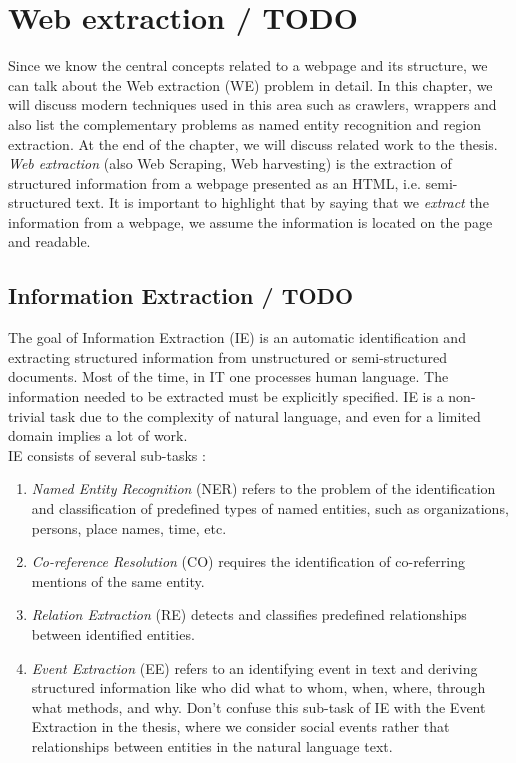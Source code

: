\chapter{Web extraction / TODO}

Since we know the central concepts related to a webpage and its structure, we can talk about the Web extraction (WE) problem in detail. In this chapter, we will discuss modern techniques used in this area such as crawlers, wrappers and also list the complementary problems as named entity recognition and region extraction. At the end of the chapter, we will discuss related work to the thesis.\\

\textit{Web extraction} (also Web Scraping, Web harvesting) is the extraction of structured information from a webpage presented as an HTML, i.e. semi-structured text. It is important to highlight that by saying that we \textit{extract} the information from a webpage, we assume the information is located on the page and readable.


\section{Information Extraction / TODO}

The goal of Information Extraction (IE) is an automatic identification and extracting structured information from unstructured or semi-structured documents. Most of the time, in IT one processes human language. The information needed to be extracted must be explicitly specified. IE is a non-trivial task due to the complexity of natural language, and even for a limited domain implies a lot of work.\\

IE consists of several sub-tasks \cite{InfExtr}:

\begin{enumerate}
    \item \textit{Named Entity Recognition} (NER) refers to the problem of the identification and classification of predefined types of named entities, such as organizations, persons, place names, time, etc.
    \item \textit{Co-reference Resolution} (CO) requires the identification of co-referring mentions of the same entity.
    \item \textit{Relation Extraction} (RE) detects and classifies predefined relationships between identified entities.
    \item \textit{Event Extraction} (EE) refers to an identifying event in text and deriving structured information like who did what to whom, when, where, through what methods, and why. Don't confuse this sub-task of IE with the Event Extraction in the thesis, where we consider social events rather that relationships between entities in the natural language text. 
\end{enumerate}

